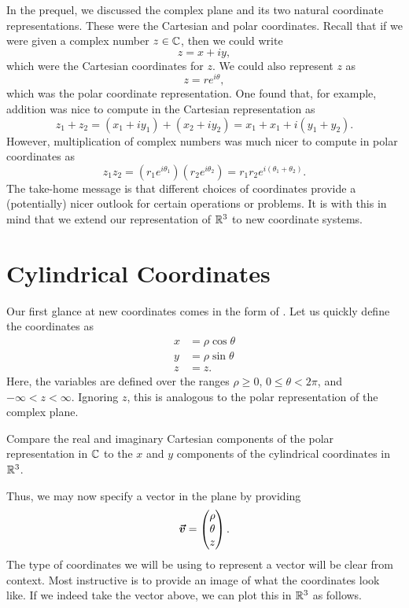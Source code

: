 In the prequel, we discussed the complex plane and its two natural coordinate representations.  These were the Cartesian and polar coordinates.  Recall that if we were given a complex number $z\in \mathbb{C}$, then we could write
\[
z=x+iy,
\]
which were the Cartesian coordinates for $z$. We could also represent $z$ as
\[
z=re^{i\theta},
\]
which was the polar coordinate representation.  One found that, for example, addition was nice to compute in the Cartesian representation as
\[
z_1+z_2 = (x_1+iy_1)+(x_2+iy_2) = x_1+x_1 + i (y_1+y_2).
\]
However, multiplication of complex numbers was much nicer to compute in polar coordinates as
\[
z_1z_2 = \left(r_1 e^{i\theta_1}\right)\left(r_2 e^{i\theta_2}\right) = r_1r_2 e^{i(\theta_1+\theta_2)}.
\]
The take-home message is that different choices of coordinates provide a (potentially) nicer outlook for certain operations or problems. It is with this in mind that we extend our representation of $\mathbb{R}^3$ to new coordinate systems.

\section{Cylindrical Coordinates}

Our first glance at new coordinates comes in the form of .  Let us quickly define the coordinates as
\begin{align*}
	x &= \rho \cos \theta\\
	y &= \rho \sin \theta\\
	z &= z.
\end{align*}
Here, the variables are defined over the ranges $\rho\geq0$, $0\leq \theta < 2\pi$, and $-\infty < z < \infty$.  Ignoring $z$, this is analogous to the polar representation of the complex plane.

\begin{exercise}
	Compare the real and imaginary Cartesian components of the polar representation in $\mathbb{C}$ to the $x$ and $y$ components of the cylindrical coordinates in $\mathbb{R}^3$.
\end{exercise}	

Thus, we may now specify a vector in the plane by providing
\[
\boldsymbol{\boldsymbol{\vec{v}}} = \begin{pmatrix} \rho \\ \theta \\ z \end{pmatrix}.
\]
The type of coordinates we will be using to represent a vector will be clear from context.  Most instructive is to provide an image of what the coordinates look like.  If we indeed take the vector above, we can plot this in $\mathbb{R}^3$ as follows.

